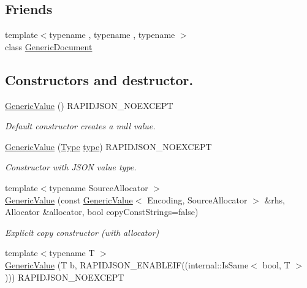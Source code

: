\subsection*{Friends}
\begin{DoxyCompactItemize}
\item 
{\footnotesize template$<$typename , typename , typename $>$ }\\class \hyperlink{classGenericValue_ab05bc9e52e201a2867ea5bac141ee1ae}{Generic\+Document}
\end{DoxyCompactItemize}
\subsection*{Constructors and destructor.}
\begin{DoxyCompactItemize}
\item 
\hyperlink{classGenericValue_ab0205d57176d83814ea4e4598c596fe8}{Generic\+Value} () R\+A\+P\+I\+D\+J\+S\+O\+N\+\_\+\+N\+O\+E\+X\+C\+E\+PT
\begin{DoxyCompactList}\small\item\em Default constructor creates a null value. \end{DoxyCompactList}\item 
\hyperlink{classGenericValue_a83c8f84b8e61f2f40414b703b75aea61}{Generic\+Value} (\hyperlink{rapidjson_8h_a1d1cfd8ffb84e947f82999c682b666a7}{Type} \hyperlink{imgui__impl__opengl3__loader_8h_a63267399cd2a2ee217572c11d2e54f07}{type}) R\+A\+P\+I\+D\+J\+S\+O\+N\+\_\+\+N\+O\+E\+X\+C\+E\+PT
\begin{DoxyCompactList}\small\item\em Constructor with J\+S\+ON value type. \end{DoxyCompactList}\item 
{\footnotesize template$<$typename Source\+Allocator $>$ }\\\hyperlink{classGenericValue_a76c68b72723a06045776dbd425f9e8b6}{Generic\+Value} (const \hyperlink{classGenericValue}{Generic\+Value}$<$ Encoding, Source\+Allocator $>$ \&rhs, Allocator \&allocator, bool copy\+Const\+Strings=false)
\begin{DoxyCompactList}\small\item\em Explicit copy constructor (with allocator) \end{DoxyCompactList}\item 
{\footnotesize template$<$typename T $>$ }\\\hyperlink{classGenericValue_a0f6a0394bfffaedde88e433b2265194c}{Generic\+Value} (T b, R\+A\+P\+I\+D\+J\+S\+O\+N\+\_\+\+E\+N\+A\+B\+L\+E\+IF((internal\+::\+Is\+Same$<$ bool, T $>$))) R\+A\+P\+I\+D\+J\+S\+O\+N\+\_\+\+N\+O\+E\+X\+C\+E\+PT

\end{DoxyCompactItemize}
